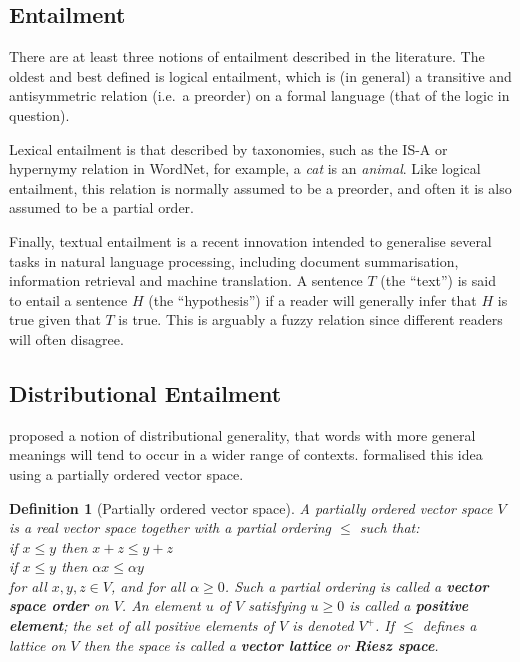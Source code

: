 \documentclass{article}
\newtheorem{definition}{Definition}
\begin{document}
\subsection{Entailment}

There are at least three notions of entailment described in the
literature. The oldest and best defined is logical entailment, which
is (in general) a transitive and antisymmetric relation (i.e.~a
preorder) on a formal language (that of the logic in question).

Lexical entailment is that described by taxonomies, such as the IS-A
or hypernymy relation in WordNet, for example, a \emph{cat} is an
\emph{animal}. Like logical entailment, this relation is normally
assumed to be a preorder, and often it is also assumed to be a partial
order.

Finally, textual entailment is a recent innovation intended to
generalise several tasks in natural language processing, including
document summarisation, information retrieval and machine
translation. A sentence $T$ (the ``text'') is said to entail a
sentence $H$ (the ``hypothesis'') if a reader will generally infer
that $H$ is true given that $T$ is true. This is arguably a fuzzy
relation since different readers will often disagree.

\subsection{Distributional Entailment}

\cite{Weeds} proposed a notion of distributional generality, that
words with more general meanings will tend to occur in a wider range
of contexts. \cite{Clarke:07} formalised this idea using a partially
ordered vector space.

\begin{definition}[Partially ordered vector space]
  A partially ordered vector space $V$ is a real vector space together
  with a partial ordering $\le$ such that:
  \vspace{0.1cm}\\
  \indent if $x \le y$ then $x + z \le y + z$\\
  \indent if $x \le y$ then $\alpha x \le \alpha y$
  \vspace{0.1cm}\\
  for all $x,y,z \in V$, and for all $\alpha \ge 0$. Such a partial
  ordering is called a \textbf{vector space order} on $V$. An element
  $u$ of $V$ satisfying $u \ge 0$ is called a \textbf{positive
    element}; the set of all positive elements of $V$ is denoted
  $V^+$. If $\le$ defines a lattice on $V$ then the space is called a
  \textbf{vector lattice} or \textbf{Riesz space}.
\end{definition}
\end{document}
